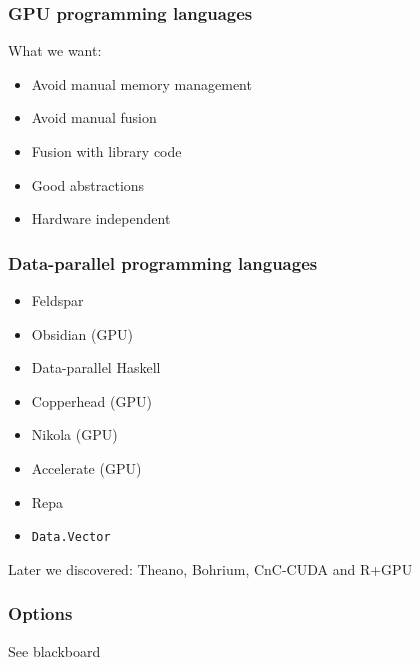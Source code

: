 \documentclass{beamer}
\begin{document}

\begin{frame}
  \frametitle{GPU programming languages}

What we want:
  \begin{itemize}
  \item Avoid manual memory management
  \item Avoid manual fusion
  \item Fusion with library code
  \item Good abstractions
  \item Hardware independent
  \end{itemize}
\end{frame}


\begin{frame}
  \frametitle{Data-parallel programming languages}

  \begin{itemize}
  \item Feldspar
  \item Obsidian (GPU)
  \item Data-parallel Haskell
  \item Copperhead (GPU)
  \item \alert<2>{Nikola (GPU)}
  \item \alert<2>{Accelerate (GPU)}
  \item \alert<2>{Repa}
  \item \alert<2>{\texttt{Data.Vector}}
  \end{itemize}

  \vspace{1cm}
  Later we discovered: Theano, Bohrium, CnC-CUDA and R+GPU
\end{frame}


\begin{frame}
  \frametitle{Options}
  \begin{center}\Large
    See blackboard
  \end{center}

\end{frame}
\end{document}
